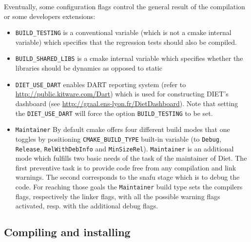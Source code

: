 Eventually, some configuration flags control the general result of the
compilation or some developers extensions:
\begin{itemize}
\item
  \verb+BUILD_TESTING+ is a conventional variable (which is not a cmake
  internal variable) which specifies that the regression tests should
  also be compiled.

\item
  \verb+BUILD_SHARED_LIBS+ is a cmake internal variable which specifies
  whether the libraries should be dynamics as opposed to static

\item
  \verb+DIET_USE_DART+ enables DART reporting system (refer to 
  \url{http://public.kitware.com/Dart}) which is used for constructing
  DIET's dashboard (see \url{http://graal.ens-lyon.fr/DietDashboard}).
  Note that setting the \verb+DIET_USE_DART+ will force the option
  \verb+BUILD_TESTING+ to be set.

\item
  \verb+Maintainer+ By default cmake offers four different build modes
  that one toggles by positioning \verb+CMAKE_BUILD_TYPE+ built-in
  variable (to \verb+Debug+, \verb+Release+, \verb+RelWithDebInfo+
  and \verb+MinSizeRel+).
  \verb+Maintainer+ is an additional mode which fulfills two basic needs
  of the task of the maintainer of Diet.
  The first preventive task is to provide code free from any compilation
  and link warnings.
  The second corresponds to the snafu stage which is to debug the code.
  For reaching those goals the \verb+Maintainer+ build type sets the
  compilers flags, respectively the linker flags, with all the possible
  warning flags activated, resp. with the additional debug flags.
\end{itemize}

\subsection{Compiling and installing}

